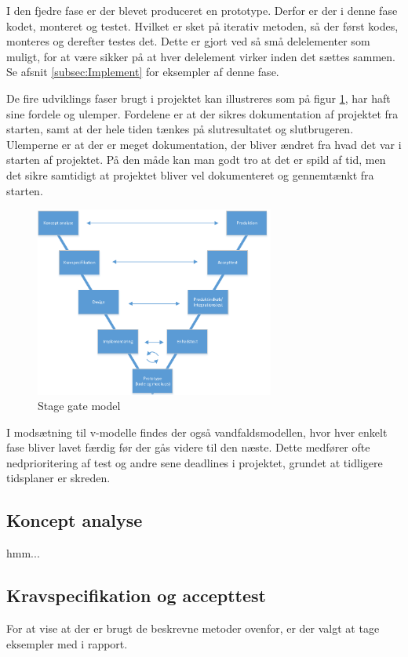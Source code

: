 I den fjedre fase er der blevet produceret en prototype. Derfor er der i denne fase kodet, monteret og testet. Hvilket er sket på iterativ metoden, så der først kodes, monteres og derefter testes det. Dette er gjort ved så små delelementer som muligt, for at være sikker på at hver delelement virker inden det sættes sammen. Se afsnit \ref{subsec:Implement} for eksempler af denne fase. 

De fire udviklings faser brugt i projektet kan illustreres som på figur \ref{fig:v-model}, har haft sine fordele og ulemper. Fordelene er at der sikres dokumentation af projektet fra starten, samt at der hele tiden tænkes på slutresultatet og slutbrugeren. Ulemperne er at der er meget dokumentation, der bliver ændret fra hvad det var i starten af projektet. På den måde kan man godt tro at det er spild af tid, men det sikre samtidigt at projektet bliver vel dokumenteret og gennemtænkt fra starten.

\begin{figure}[H]
	\centering
	\includegraphics[width=0.7\textwidth]{billeder/Hovedrapport/V-model.PDF}
	\caption{Stage gate model}
	\label{fig:v-model}
\end{figure}

I modsætning til v-modelle findes der også vandfaldsmodellen, hvor hver enkelt fase bliver lavet færdig før der gås videre til den næste. Dette medfører ofte nedprioritering af test og andre sene deadlines i projektet, grundet at tidligere tidsplaner er skreden.

\subsection{Koncept analyse}
hmm...
 
\subsection{Kravspecifikation og accepttest}
\label{subsec:krav}
For at vise at der er brugt de beskrevne metoder ovenfor, er der valgt at tage eksempler med i rapport. %

